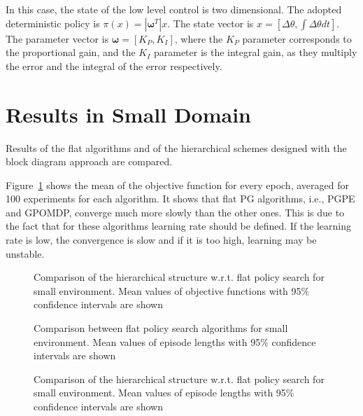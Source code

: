  In this case, the state of the low level control is two dimensional. The adopted deterministic policy is $\pi(x) = \left|\boldsymbol{\omega}^T\right|x$. The state vector is $x=\left[\Delta\theta, \int\Delta\theta dt\right]$. The parameter vector is $\boldsymbol{\omega}=\left[K_P, K_I\right]$, where the $K_P$ parameter corresponds to the proportional gain, and the $K_I$ parameter is the integral gain, as they multiply the error and the integral of the error respectively.


\section{Results in Small Domain}

Results of the flat algorithms and of the hierarchical schemes designed with the block diagram approach are compared. 

Figure~\ref{fig:art_J} shows the mean of the objective function for every epoch, averaged for 100 experiments for each algorithm. It shows that flat PG algorithms, i.e., PGPE and GPOMDP, converge much more slowly than the other ones. This is due to the fact that for these algorithms learning rate should be defined. If the learning rate is low, the convergence is slow and if it is too high, learning may be unstable. 

\begin{figure}[t!]
	\centering
    \vspace{-1.0 cm}
    \setlength\figureheight{5.5cm}  
	\setlength{}
	
    \caption[J comparison, hierarchical vs. flat, small environment]{Comparison of the hierarchical structure w.r.t. flat policy search for small environment. Mean values of objective functions with 95\% confidence intervals are shown}
    \label{fig:art_J}
\end{figure} 

\begin{figure}[t!]
	\centering
	\setlength\figureheight{5.5cm}  
	\setlength{}
	
    \caption[Epiosde length comparison, flat algorithms, small environment]{Comparison between flat policy search algorithms for small environment. Mean values of episode lengths with 95\% confidence intervals are shown}
    	\label{fig:art_j}
\end{figure}
\begin{figure}[t!]
	\centering
    \setlength\figureheight{5.5cm}  
	\setlength{}
	
    \caption[J comparison, flat vs. hierarchical, small environment]{Comparison of the hierarchical structure w.r.t. flat policy search for small environment. Mean values of episode lengths with 95\% confidence intervals are shown}
    	\label{fig:comp_art_l}
\end{figure}

